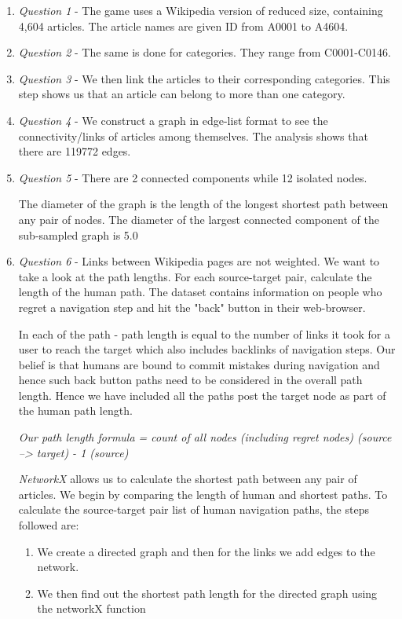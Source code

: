 \documentclass[11pt]{article}
\begin{document}
\begin{enumerate}
\item \textit{Question 1} - The game uses a Wikipedia version of reduced size, containing 4,604 articles. The article names are given ID from A0001 to A4604.

\item \textit{Question 2} -  The same is done for categories. They range from C0001-C0146.

\item \textit{Question 3} -  We then link the articles to their corresponding categories. This step shows us that an article can belong to more than one category.

\item \textit{Question 4} - We construct a graph in edge-list format to see the connectivity/links of articles among themselves. The analysis shows that there are 119772 edges.

\item \textit{Question 5} - There are 2 connected components while 12 isolated nodes.

The diameter of the graph is the length of the longest shortest path between any pair of nodes. The diameter of the largest connected component of the sub-sampled graph is  5.0

\item \textit{Question 6} - Links between Wikipedia pages are not weighted.
 We want to take a look at the path lengths. For each source-target pair, calculate the length of the human path. The dataset contains information on people who regret a navigation step and hit the "back" button in their web-browser.

In each of the path - path length is equal to the number of links it took for a user to reach the target which also includes backlinks of navigation steps. Our belief is that humans are bound to commit mistakes during navigation and hence such back button paths need to be considered in the overall path length. Hence we have included all the paths post the target node as part of the human path length.

\textit{ Our path length formula = count of all nodes (including regret nodes) (source --> target) - 1 (source)}

\textit{NetworkX} allows us to calculate the shortest path between any pair of articles. We begin by comparing the length of human and shortest paths. 
To calculate the source-target pair list of human navigation paths, the steps followed are:
\begin{enumerate}
\item We create a directed graph and then for the links we add edges to the network.
\item We then find out the shortest path length for the directed graph using the networkX function
\end{enumerate}


\end{enumerate}
\end{document}
